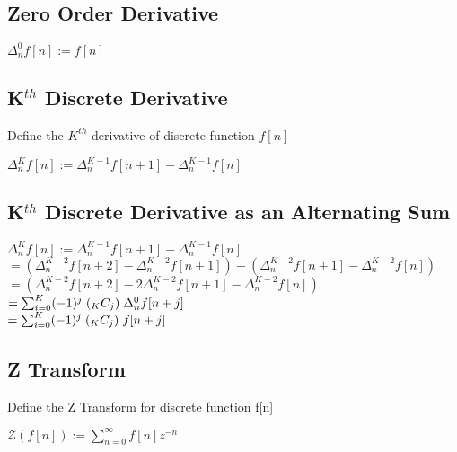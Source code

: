 \documentclass[11pt]{article}
\begin{document}
\subsection{Zero Order Derivative}
\begin{center}
\vspace{1mm}
$
\Delta_n^0 f[n] := f[n]
$
\end{center}



\subsection{K$^{th}$ Discrete Derivative}
Define the $K^{th}$ derivative of discrete function $f[n]$
\begin{center}
\vspace{1mm}
$
\Delta_n^K f[n] := \Delta_n^{K-1} f[n+1] - \Delta_n^{K-1} f[n]
$
\end{center}




\subsection{K$^{th}$ Discrete Derivative as an Alternating Sum}
\begin{center}
$
\Delta_n^K f[n] := \Delta_n^{K-1} f[n+1] - \Delta_n^{K-1} f[n]
$
\\ \vspace{4mm}
$
= (\Delta_n^{K-2} f[n+2] - \Delta_n^{K-2} f[n+1]) - (\Delta_n^{K-2} f[n+1] - \Delta_n^{K-2} f[n])
$
\\ \vspace{4mm}
$
= (\Delta_n^{K-2} f[n+2] - 2\Delta_n^{K-2} f[n+1] - \Delta_n^{K-2} f[n])
$
\\ \vspace{4mm}
$
=  \sum_{i=0}^K (-1)^{j} \hspace{1mm} (_K C _j) \hspace{1mm} \Delta_n^{0} f[n + j]
$
\\ \vspace{4mm}
$
= \sum_{i=0}^K (-1)^{j} \hspace{1mm} (_K C _j) \hspace{1mm} f[n + j]
$
\end{center}








\subsection{Z Transform}
Define the Z Transform for discrete function f[n]
\begin{center}
$
\mathcal{Z}(f[n]) := \sum_{n=0}^{\infty}f[n]z^{-n}
$
\end{center}
\end{document}
